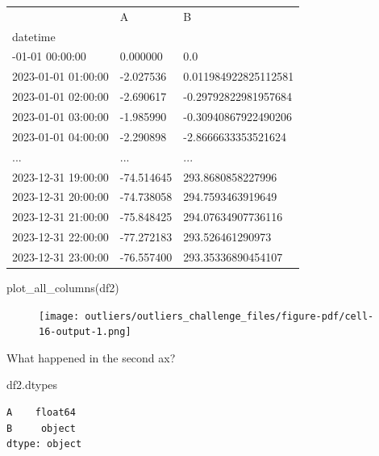 \documentclass[
  letterpaper,
  DIV=11,
  numbers=noendperiod,
  oneside]{scrreprt}
\newenvironment{Shaded}{\begin{snugshade}}{\end{snugshade}}
\newcommand{\NormalTok}[1]{\textcolor[rgb]{0.00,0.23,0.31}{#1}}
\begin{document}
\begin{longtable}[]{@{}lll@{}}
\toprule\noalign{}
& A & B \\
datetime & & \\
\midrule\noalign{}
\endhead
\bottomrule\noalign{}
\endlastfoot
2023-01-01 00:00:00 & 0.000000 & 0.0 \\
2023-01-01 01:00:00 & -2.027536 & 0.011984922825112581 \\
2023-01-01 02:00:00 & -2.690617 & -0.29792822981957684 \\
2023-01-01 03:00:00 & -1.985990 & -0.30940867922490206 \\
2023-01-01 04:00:00 & -2.290898 & -2.8666633353521624 \\
... & ... & ... \\
2023-12-31 19:00:00 & -74.514645 & 293.8680858227996 \\
2023-12-31 20:00:00 & -74.738058 & 294.7593463919649 \\
2023-12-31 21:00:00 & -75.848425 & 294.07634907736116 \\
2023-12-31 22:00:00 & -77.272183 & 293.526461290973 \\
2023-12-31 23:00:00 & -76.557400 & 293.35336890454107 \\
\end{longtable}

\begin{Shaded}
\begin{Highlighting}[]
\NormalTok{plot\_all\_columns(df2)}
\end{Highlighting}
\end{Shaded}

\begin{figure}[H]

{\centering \texttt{[image: outliers/outliers\_challenge\_files/figure-pdf/cell-16-output-1.png]}

}

\end{figure}

What happened in the second ax?

\begin{Shaded}
\begin{Highlighting}[]
\NormalTok{df2.dtypes}
\end{Highlighting}
\end{Shaded}

\begin{verbatim}
A    float64
B     object
dtype: object
\end{verbatim}
\end{document}
